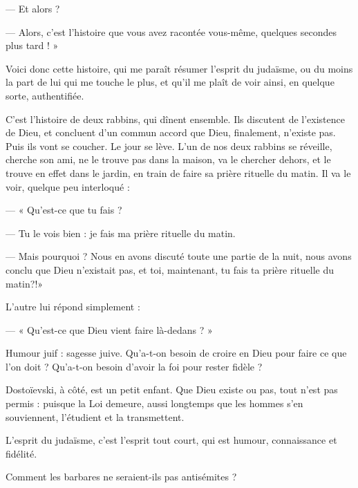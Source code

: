 {— Et alors ?

— Alors, c’est l’histoire que vous avez racontée vous-même, quelques
secondes plus tard ! »

Voici donc cette histoire, qui me paraît résumer l’esprit du judaïsme, ou du
moins la part de lui qui me touche le plus, et qu’il me plaît de voir ainsi, en
quelque sorte, authentifiée.

C’est l’histoire de deux rabbins, qui dînent ensemble. Ils discutent de l’existence
de Dieu, et concluent d’un commun accord que Dieu, finalement,
n'existe pas. Puis ils vont se coucher. Le jour se lève. L'un de nos deux rabbins
se réveille, cherche son ami, ne le trouve pas dans la maison, va le chercher
dehors, et le trouve en effet dans le jardin, en train de faire sa prière rituelle du
matin. Il va le voir, quelque peu interloqué :

— « Qu'est-ce que tu fais ?

— Tu le vois bien : je fais ma prière rituelle du matin.

— Mais pourquoi ? Nous en avons discuté toute une partie de la nuit, nous
avons conclu que Dieu n'existait pas, et toi, maintenant, tu fais ta prière rituelle
du matin?!»

L'autre lui répond simplement :

— « Qu'est-ce que Dieu vient faire là-dedans ? »

Humour juif : sagesse juive. Qu’a-t-on besoin de croire en Dieu pour faire
ce que l’on doit ? Qu’a-t-on besoin d’avoir la foi pour rester fidèle ?

Dostoïevski, à côté, est un petit enfant. Que Dieu existe ou pas, tout n’est
pas permis : puisque la Loi demeure, aussi longtemps que les hommes s’en souviennent,
l’étudient et la transmettent.

L'esprit du judaïsme, c’est l’esprit tout court, qui est humour, connaissance
et fidélité.

Comment les barbares ne seraient-ils pas antisémites ?

}
